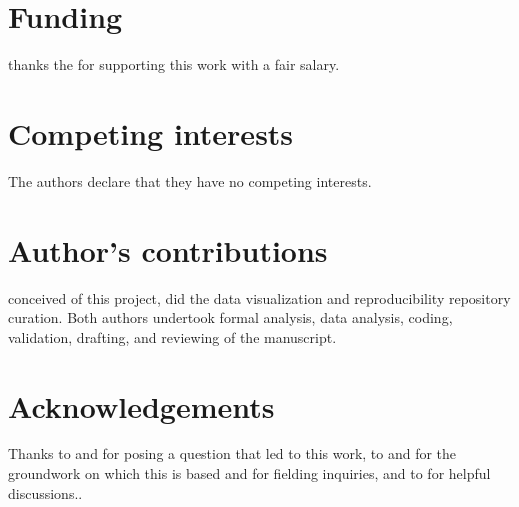 \documentclass{bmcart}
\begin{document}
\begin{backmatter}

\section*{Funding}
   thanks the  for supporting this work with a fair salary. 
  
\section*{Competing interests}
  The authors declare that they have no competing interests.

\section*{Author's contributions}
   conceived of this project, did the data visualization and reproducibility repository curation. Both authors undertook formal analysis, data analysis, coding, validation, drafting, and reviewing of the manuscript. 

\section*{Acknowledgements}
   Thanks to  and  for posing a question that led to this work, to  and  for the groundwork on which this is based and for fielding inquiries, and to  for helpful discussions..



\end{backmatter}
\end{document}
